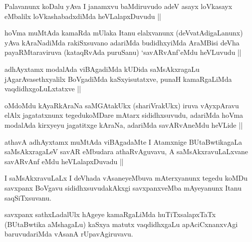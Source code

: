
\begin{artha}
Palavanunx koDalu yAva I janamxvu baMdiruvudo adeV asayx loVkasayx eMbalilx loVkashabadxdiMda heVLalapxDuvudu ||
\end{artha}


\begin{artha}
hoVma muMtAda kamaRda mUlaka Itanu elalxvanunx (deVvatAdigaLanunx) yAva kAraNadiMda rakiSxsuvano adariMda budidhxyiMda AraMBisi deVha payaRMtaraviruva (kataqRvAda puruSanu) `savARvAnf'eMdu heVLuvudu ||
\end{artha}

\begin{artha}
adhAyxtamx modalAda viBAgadiMda kUDida saMsAkxragaLu jAgarAvasethxyalilx BoVgadiMda kaSxyisutatxve, punaH kamaRgaLiMda vaqdidhxgoLuLxtatxve ||
\end{artha}


\begin{artha}
oMdoMdu kAyaRkAraNa saMGAtakUkx (shariVrakUkx) iruva vAyxpAravu elAlx jagatatxnunx tegedukoMDare mAtarx sididhxsuvudu, adariMda hoVma modalAda kirxyeyu jagatitxge kAraNa, adariMda savARvAneMdu heVLide ||
\end{artha}


\begin{artha}
athavA adhAyxtamx muMtAda viBAgadaMte I Atamxnige BUtaBwtikagaLa saMsAkxragaLeV savAR eMbudara athaRvAguvavu, A saMsAkxravuLaLxvane savARvAnf eMdu heVLalapxDuvadu ||
\end{artha}

\begin{artha}
I saMsAkxravuLaLx I deVhada vAsaneyeMbuva mAterxyanunx tegedu koMDu savxpanx BoVgavu sididhxsuvudakAkxgi savxpanxveMba mAyeyanunx Itanu saqSiTxsuvanu.
\end{artha}

\begin{artha}
savxpanx sathxLadalUlx hAgeye kamaRgaLiMda huTiTxsalapxTaTx (BUtaBwtika aMshagaLu) kaSxya matutx vaqdidhxgaLu apAciCxnanxvAgi baruvudariMda vAsanA rUpavAgiruvavu.
\end{artha}

